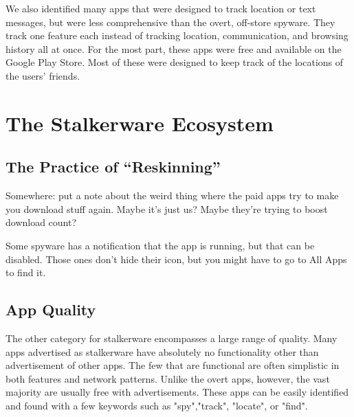 \documentclass[acmtog]{acmart}
\begin{document}
We also identified many apps that were designed to track location or text 
messages, but were less comprehensive than the overt, off-store spyware. They 
track one feature each instead of tracking location, communication, and 
browsing history all at once. For the most part, these apps were free and 
available on the Google Play Store. Most of these were designed to keep track 
of the locations of the users' friends. 

\section{The Stalkerware Ecosystem}
\subsection{The Practice of ``Reskinning''}
\label{reskinning}

Somewhere: put a note about the weird thing where the paid apps try to make you 
download stuff again. Maybe it's just us? Maybe they're trying to boost 
download count?

Some spyware has a notification that the app is running, but that can be 
disabled. Those ones don't hide their icon, but you might have to go to All 
Apps to find it.

\subsection{App Quality}

The other category for stalkerware encompasses a large range of quality. Many 
apps advertised as stalkerware have absolutely no functionality other than 
advertisement of other apps. The few that are functional are often simplistic 
in both features and network patterns. Unlike the overt apps, however, the vast 
majority are usually free with advertisements. These apps can be easily 
identified and found with a few keywords such as "spy","track", "locate", or 
"find". 
\end{document}
